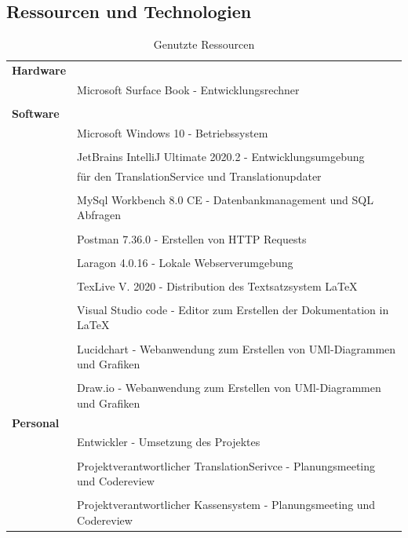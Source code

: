 \documentclass[10pt, oneside, ngerman]{article}
\begin{document}
\subsection{Ressourcen und Technologien}\label{sec:resources}
  \begin{table}[ht]
    \begin{tabular}{ l  l }
      \hline
      \rowcolor{carolinablue}
      \textbf{Hardware} & \\
      & Microsoft Surface Book - Entwicklungsrechner\\
      & \\
      \hline
      \rowcolor{carolinablue}
      \textbf{Software} & \\
      \hline
      & Microsoft Windows 10 - Betriebssystem\\
      &  \\
      \multirow{2}{*}{ }& JetBrains IntelliJ Ultimate 2020.2  - Entwicklungsumgebung\\ &für den TranslationService und Translationupdater\\
      & \\
      & MySql Workbench 8.0 CE - Datenbankmanagement und SQL Abfragen\\
      & \\
      & Postman 7.36.0 - Erstellen von HTTP Requests\\
      & \\
      & Laragon 4.0.16 - Lokale Webserverumgebung\\
      & \\
      & TexLive V. 2020 - Distribution des Textsatzsystem \LaTeX\\
      & \\
      & Visual Studio code - Editor zum Erstellen der Dokumentation in \LaTeX\\
      & \\
      & Lucidchart - Webanwendung zum Erstellen von UMl-Diagrammen und Grafiken\\
      &\\
      & Draw.io - Webanwendung zum Erstellen von UMl-Diagrammen und Grafiken\\
      \hline
      \rowcolor{carolinablue}
      \textbf{Personal} & \\
        & Entwickler - Umsetzung des Projektes\\
        & \\
        & Projektverantwortlicher TranslationSerivce - Planungsmeeting und Codereview\\
        & \\
        & Projektverantwortlicher Kassensystem - Planungsmeeting und Codereview\\
    \end{tabular}
    \caption{Genutzte Ressourcen}
  \end{table}
    \newpage
\end{document}
